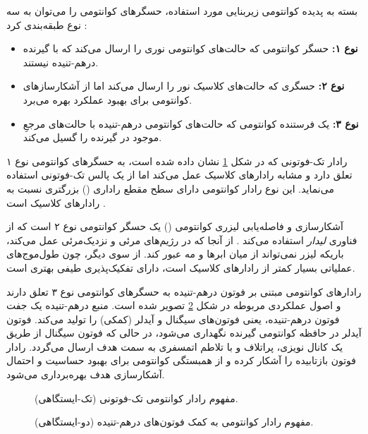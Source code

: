 بسته به پدیده کوانتومی زیربنایی مورد استفاده، حسگرهای کوانتومی را می‌توان به سه نوع طبقه‌بندی کرد \cite{7, 31}:
\begin{itemize}
	\item \textbf{نوع ۱:} حسگر کوانتومی که حالت‌های کوانتومی نوری را ارسال می‌کند که با گیرنده درهم-تنیده نیستند.
	\item \textbf{نوع ۲:} حسگری که حالت‌های کلاسیک نور را ارسال می‌کند اما از آشکارسازهای کوانتومی برای بهبود عملکرد بهره می‌برد.
	\item \textbf{نوع ۳:} یک فرستنده کوانتومی که حالت‌های کوانتومی درهم-تنیده با حالت‌های مرجعِ موجود در گیرنده را گسیل می‌کند.
\end{itemize}
رادار تک-فوتونی که در شکل \ref{fig:11-9} نشان داده شده است، به حسگرهای کوانتومی نوع ۱ تعلق دارد و مشابه رادارهای کلاسیک عمل می‌کند اما از یک پالس تک-فوتونی استفاده می‌نماید. این نوع رادار کوانتومی دارای سطح مقطع راداری () بزرگتری نسبت به رادارهای کلاسیک است \cite{7}.

آشکارسازی و فاصله‌یابی لیزری کوانتومی () یک حسگر کوانتومی نوع ۲ است که از فناوری \textit{لیدار} استفاده می‌کند \cite{7, 32, 33, 34}. از آنجا که  در رژیم‌های مرئی و نزدیک‌مرئی عمل می‌کند، باریکه لیزر نمی‌تواند از میان ابرها و مه عبور کند. از سوی دیگر، چون طول‌موج‌های عملیاتی بسیار کمتر از رادارهای کلاسیک است،  دارای تفکیک‌پذیری طیفی بهتری است.

رادارهای کوانتومی مبتنی بر فوتون درهم-تنیده به حسگرهای کوانتومی نوع ۳ تعلق دارند و اصول عملکردی مربوطه در شکل \ref{fig:11-10} تصویر شده است. منبع درهم-تنیده یک جفت فوتون درهم-تنیده، یعنی فوتون‌های سیگنال و آیدلر (کمکی) را تولید می‌کند. فوتون آیدلر در حافظه کوانتومی گیرنده نگهداری می‌شود، در حالی که فوتون سیگنال از طریق یک کانال نویزی، پراتلاف و با تلاطم اتمسفری به سمت هدف ارسال می‌گردد. رادار فوتون بازتابیده را آشکار کرده و از همبستگی کوانتومی برای بهبود حساسیت و احتمال آشکارسازی هدف بهره‌برداری می‌شود.

\begin{figure}[ht]
	\centering
	\caption{مفهوم رادار کوانتومی تک-فوتونی (تک-ایستگاهی).}
	\label{fig:11-9}
\end{figure}

\begin{figure}[ht]
	\centering
	\caption{مفهوم رادار کوانتومی به کمک فوتون‌های درهم-تنیده (دو-ایستگاهی).}
	\label{fig:11-10}
\end{figure}

